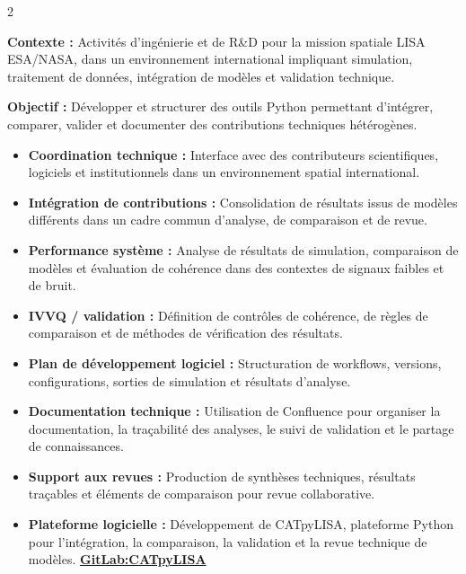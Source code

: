 \documentclass[8pt,a4paper,ragged2e,withhyper]{altacv}
\begin{document}
\begin{paracol}{2}
\divider


\textbf{Contexte :} Activités d’ingénierie et de R\&D pour la mission spatiale LISA ESA/NASA, dans un environnement international impliquant simulation, traitement de données, intégration de modèles et validation technique.

\textbf{Objectif :} Développer et structurer des outils Python permettant d’intégrer, comparer, valider et documenter des contributions techniques hétérogènes.

\begin{itemize}
  \item \textbf{Coordination technique :} Interface avec des contributeurs scientifiques, logiciels et institutionnels dans un environnement spatial international.
  \item \textbf{Intégration de contributions :} Consolidation de résultats issus de modèles différents dans un cadre commun d’analyse, de comparaison et de revue.
  \item \textbf{Performance système :} Analyse de résultats de simulation, comparaison de modèles et évaluation de cohérence dans des contextes de signaux faibles et de bruit.
  \item \textbf{IVVQ / validation :} Définition de contrôles de cohérence, de règles de comparaison et de méthodes de vérification des résultats.
  \item \textbf{Plan de développement logiciel :} Structuration de workflows, versions, configurations, sorties de simulation et résultats d’analyse.
  \item \textbf{Documentation technique :} Utilisation de Confluence pour organiser la documentation, la traçabilité des analyses, le suivi de validation et le partage de connaissances.
  \item \textbf{Support aux revues :} Production de synthèses techniques, résultats traçables et éléments de comparaison pour revue collaborative.
  \item \textbf{Plateforme logicielle :} Développement de CATpyLISA, plateforme Python pour l’intégration, la comparaison, la validation et la revue technique de modèles.
  \textcolor{DarkPastelRed}{\href{https://gitlab.oca.eu/gboileau/lisa_l3_tools}{\bf GitLab:CATpyLISA}}
\end{itemize}


\end{paracol}
\end{document}

